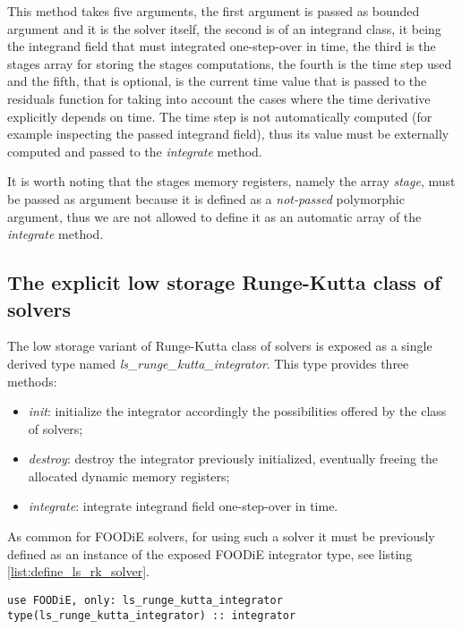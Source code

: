 \documentclass[pdftex,preprint,3p,times,numbers]{elsarticle}
\begin{document}
This method takes five arguments, the first argument is passed as bounded argument and it is the solver itself, the second is of an integrand class, it being the integrand field that must integrated one-step-over in time, the third is the stages array for storing the stages computations, the fourth is the time step used and the fifth, that is optional, is the current time value that is passed to the residuals function for taking into account the cases where the time derivative explicitly depends on time. The time step is not automatically computed (for example inspecting the passed integrand field), thus its value must be externally computed and passed to the \emph{integrate} method.

It is worth noting that the stages memory registers, namely the array \emph{stage}, must be passed as argument because it is defined as a \emph{not-passed} polymorphic argument, thus we are not allowed to define it as an automatic array of the \emph{integrate} method.

\subsection{The explicit low storage Runge-Kutta class of solvers}\label{subsec:solver_ls_rk}

The low storage variant of Runge-Kutta class of solvers is exposed as a single derived type named \emph{ls\_runge\_kutta\_integrator}. This type provides three methods:

\begin{itemize}
  \item \emph{init}: initialize the integrator accordingly the possibilities offered by the class of solvers;
  \item \emph{destroy}: destroy the integrator previously initialized, eventually freeing the allocated dynamic memory registers;
  \item \emph{integrate}: integrate integrand field one-step-over in time.
  \end{itemize}

As common for FOODiE solvers, for using such a solver it must be previously defined as an instance of the exposed FOODiE integrator type, see listing \ref{list:define_ls_rk_solver}.

\begin{lstlisting}[firstnumber=1,style=code,caption={definition of an explicit low storage Runge-Kutta integrator},label={list:define_ls_rk_solver}]
use FOODiE, only: ls_runge_kutta_integrator
type(ls_runge_kutta_integrator) :: integrator
\end{lstlisting}
\end{document}
